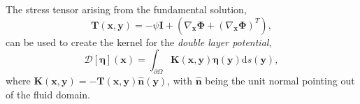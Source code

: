 \begin{comment}
From the Stokeslet, we can obtain the double layer potentials
\begin{subequations}
\begin{align}
	 \mathcal{D}[\pmb{\eta}](\mathbf{x}) &= \int_{\partial\Omega} \left(\sigma_{ij}(\pmb{\Phi}^k)n_k\right)\eta_i(\mathbf{y})\text{d}\mathbf{y} =  \int_{\partial\Omega} \mathbf{W}\pmb{\eta}(\mathbf{y})\text{d}\mathbf{y}, \label{eq:dlp_u}\\
	\mathcal{C}[\pmb{\eta}](\mathbf{x}) &= \int_{\partial\Omega} \frac{\partial \psi^k}{\partial x_j}n_j\eta_k(\mathbf{y})\text{d}\mathbf{y} = \int_{\partial\Omega}\mathbf{q}\cdot\pmb{\eta}(\mathbf{y})\text{d}\mathbf{y},
\end{align}
\end{subequations}
where $\eta(\mathbf{y}) = \langle \eta_1(\mathbf{y}), \eta_2(\mathbf{y})\rangle$ is an unknown density function and $\sigma_{ij}(\pmb{\Phi}^k)$ is called the \textit{stresslet}, given by:
\begin{equation}
	\sigma_{ij}\left(\pmb{\Phi}^k(\mathbf{x},\mathbf{y})\right) = \mathbf{I}\pmb{\psi} + \left(\nabla_{\mathbf{x}}\pmb{\Phi}^k + \nabla_{\mathbf{x}} \left(\pmb{\Phi^k}\right)^T\right).
\end{equation}


This leads to the kernels of the double layer potentials
\begin{subequations}
\begin{align}
	\mathbf{W}(\mathbf{x},\mathbf{y}) & = -\frac{1}{\pi}\left(\frac{\mathbf{r}\cdot\mathbf{n}}{\rho^4}\mathbf{r}\otimes\mathbf{r}\right),\label{eq:dlp_u_kernel}\\
		\mathbf{q}(\mathbf{x},\mathbf{y}) &= \frac{1}{\pi}\nabla_x \left(\frac{\mathbf{r}\cdot\mathbf{n}}{\rho^2}\right).
\end{align}
\end{subequations}
\end{comment}

The stress tensor arising from the fundamental solution,
\[ \mathbf{T}(\mathbf{x},\mathbf{y}) = -\psi \mathbf{I} + \left(\nabla_{\mathbf{x}} \pmb{\Phi} + \left(\nabla_{\mathbf{x}}\pmb{\Phi}\right)^T\right),\]
can be used to create the kernel for the \textit{double layer potential},
\begin{equation}\label{eq:dlp_u} \mathcal{D}[\pmb{\eta}](\mathbf{x}) = \int_{\partial\Omega} \mathbf{K}(\mathbf{x},\mathbf{y})\pmb{\eta}(\mathbf{y})\text{d}s(\mathbf{y}),\end{equation}
where $\mathbf{K}(\mathbf{x},\mathbf{y}) = -\mathbf{T}(\mathbf{x},\mathbf{y})\hat{\mathbf{n}}(\mathbf{y})$, with $\hat{\mathbf{n}}$ being the unit normal pointing out of the fluid domain. 


